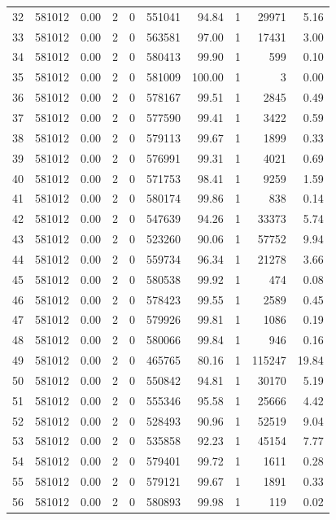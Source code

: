\documentclass[11pt]{article}
\begin{document}
\begin{enumerate}
\begin{table}[ht]
{\begin{tabular}{|l|r|r|r|l|r|r|l|r|r|}
		32 & 581012 & 0.00 & 2 & 0 & 551041 & 94.84 & 1 & 29971 & 5.16 \\
		33 & 581012 & 0.00 & 2 & 0 & 563581 & 97.00 & 1 & 17431 & 3.00 \\
		34 & 581012 & 0.00 & 2 & 0 & 580413 & 99.90 & 1 & 599 & 0.10 \\
		35 & 581012 & 0.00 & 2 & 0 & 581009 & 100.00 & 1 & 3 & 0.00 \\
		36 & 581012 & 0.00 & 2 & 0 & 578167 & 99.51 & 1 & 2845 & 0.49 \\
		37 & 581012 & 0.00 & 2 & 0 & 577590 & 99.41 & 1 & 3422 & 0.59 \\
		38 & 581012 & 0.00 & 2 & 0 & 579113 & 99.67 & 1 & 1899 & 0.33 \\
		39 & 581012 & 0.00 & 2 & 0 & 576991 & 99.31 & 1 & 4021 & 0.69 \\
		40 & 581012 & 0.00 & 2 & 0 & 571753 & 98.41 & 1 & 9259 & 1.59 \\
		41 & 581012 & 0.00 & 2 & 0 & 580174 & 99.86 & 1 & 838 & 0.14 \\
		42 & 581012 & 0.00 & 2 & 0 & 547639 & 94.26 & 1 & 33373 & 5.74 \\
		43 & 581012 & 0.00 & 2 & 0 & 523260 & 90.06 & 1 & 57752 & 9.94 \\
		44 & 581012 & 0.00 & 2 & 0 & 559734 & 96.34 & 1 & 21278 & 3.66 \\
		45 & 581012 & 0.00 & 2 & 0 & 580538 & 99.92 & 1 & 474 & 0.08 \\
		46 & 581012 & 0.00 & 2 & 0 & 578423 & 99.55 & 1 & 2589 & 0.45 \\
		47 & 581012 & 0.00 & 2 & 0 & 579926 & 99.81 & 1 & 1086 & 0.19 \\
		48 & 581012 & 0.00 & 2 & 0 & 580066 & 99.84 & 1 & 946 & 0.16 \\
		49 & 581012 & 0.00 & 2 & 0 & 465765 & 80.16 & 1 & 115247 & 19.84 \\
		50 & 581012 & 0.00 & 2 & 0 & 550842 & 94.81 & 1 & 30170 & 5.19 \\
		51 & 581012 & 0.00 & 2 & 0 & 555346 & 95.58 & 1 & 25666 & 4.42 \\
		52 & 581012 & 0.00 & 2 & 0 & 528493 & 90.96 & 1 & 52519 & 9.04 \\
		53 & 581012 & 0.00 & 2 & 0 & 535858 & 92.23 & 1 & 45154 & 7.77 \\
		54 & 581012 & 0.00 & 2 & 0 & 579401 & 99.72 & 1 & 1611 & 0.28 \\
		55 & 581012 & 0.00 & 2 & 0 & 579121 & 99.67 & 1 & 1891 & 0.33 \\
		56 & 581012 & 0.00 & 2 & 0 & 580893 & 99.98 & 1 & 119 & 0.02 \\

\end{tabular}}
\end{table}
\end{enumerate}
\end{document}

